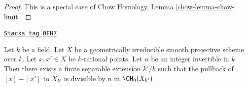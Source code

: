 \begin{proof}
This is a special case of
Chow Homology, Lemma \ref{chow-lemma-chow-limit}.
\end{proof}

\begin{lemma}
\label{weil-lemma-divide-difference-points}
\href{https://stacks.math.columbia.edu/tag/0FH7}{\texttt{Stacks tag 0FH7}}

Let $k$ be a field. Let $X$ be a geometrically irreducible
smooth projective scheme over $k$. Let $x, x' \in X$ be $k$-rational points.
Let $n$ be an integer invertible in $k$.
Then there exists a finite separable extension $k'/k$ such that
the pullback of $[x] - [x']$ to $X_{k'}$
is divisible by $n$ in $\CH_0(X_{k'})$.
\end{lemma}

